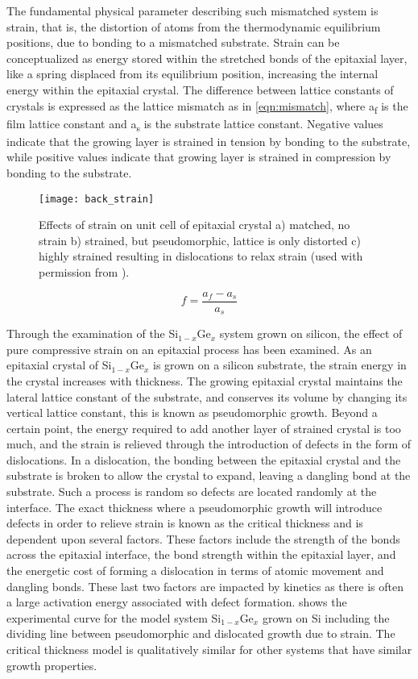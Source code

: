 The fundamental physical parameter describing such mismatched system is strain, that is, the distortion of atoms from the thermodynamic equilibrium positions, due to bonding to a mismatched substrate.
Strain can be conceptualized as energy stored within the stretched bonds of the epitaxial layer, like a spring displaced from its equilibrium position, increasing the internal energy within the epitaxial crystal. The difference between lattice constants of crystals is expressed as the lattice mismatch as in \cref{eqn:mismatch}, where a\textsubscript{f} is the film lattice constant and a\textsubscript{s} is the substrate lattice constant.
Negative values indicate that the growing layer is strained in tension by bonding to the substrate, while positive values indicate that growing layer is strained in compression by bonding to the substrate.
\begin{figure}
 \centering \texttt{[image: back\_strain]}
 \caption[Unit cell strain visualization]{\label{fig:back_strain}Effects of strain on unit cell of epitaxial crystal a) matched, no strain b) strained, but pseudomorphic, lattice is only distorted c) highly strained resulting in dislocations to relax strain (used with permission from \cite{ohring2001materials}).}
\end{figure}
\begin{equation}
    f = \frac{a_f - a_s}{a_s} \label{eqn:mismatch}
\end{equation}

Through the examination of the Si\(_{1-x}\)Ge\(_x\) system grown on silicon, the effect of pure compressive strain on an epitaxial process has been examined.
As an epitaxial crystal of Si\(_{1-x}\)Ge\(_x\) is grown on a silicon substrate, the strain energy in the crystal increases with thickness.
The growing epitaxial crystal maintains the lateral lattice constant of the substrate, and conserves its volume by changing its vertical lattice constant, this is known as pseudomorphic growth.
Beyond a certain point, the energy required to add another layer of strained crystal is too much, and the strain is relieved through the introduction of defects in the form of dislocations.
In a dislocation, the bonding between the epitaxial crystal and the substrate is broken to allow the crystal to expand, leaving a dangling bond at the substrate.
Such a process is random so defects are located randomly at the interface.
The exact thickness where a pseudomorphic growth will introduce defects in order to relieve strain is known as the critical thickness and is dependent upon several factors.
These factors include the strength of the bonds across the epitaxial interface, the bond strength within the epitaxial layer, and the energetic cost of forming a dislocation in terms of atomic movement and dangling bonds.
These last two factors are impacted by kinetics as there is often a large activation energy associated with defect formation.
 shows the experimental curve for the model system Si\(_{1-x}\)Ge\(_x\) grown on Si including the dividing line between pseudomorphic and dislocated growth due to strain.
The critical thickness model is qualitatively similar for other systems that have similar growth properties.

